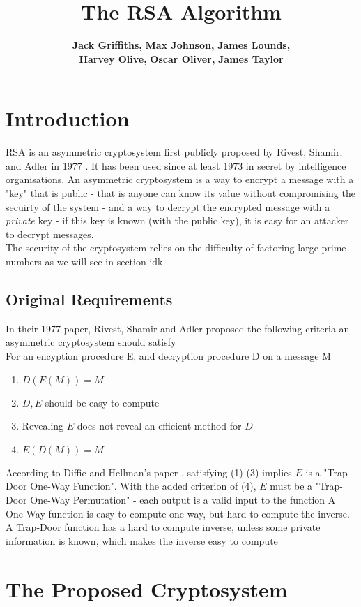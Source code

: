 \documentclass{article}
\author{
    {\bf Jack Griffiths,}
    {\bf Max Johnson,}
    {\bf James Lounds, } \\
    {\bf Harvey Olive, }
    {\bf Oscar Oliver, }
    {\bf James Taylor}
}
\title{The RSA Algorithm}
\begin{document}
\maketitle
\newpage

\section{Introduction}
RSA is an asymmetric cryptosystem first publicly proposed by Rivest, Shamir, and Adler in 1977 \cite{RSA}.
It has been used since at least 1973 in secret by intelligence organisations.
An asymmetric cryptosystem is a way to encrypt a message with a "key" that is public
- that is anyone can know its value without compromising the secuirty of the system -
and a way to decrypt the encrypted message with a \emph{private} key
- if this key is known (with the public key), it is easy for an attacker to decrypt messages.
\\
The security of the cryptosystem relies on the difficulty of factoring large prime numbers as we will see in section idk
\subsection{Original Requirements}
In their 1977 paper, Rivest, Shamir and Adler proposed the following criteria an asymmetric cryptosystem should satisfy
\\For an encyption procedure E, and decryption procedure D on a message M
\begin{enumerate}
    \item $D(E(M)) = M$
    \item $D, E$ should be easy to compute
    \item Revealing $E$ does not reveal an efficient method for $D$
    \item $E(D(M)) = M$
\end{enumerate}
According to Diffie and Hellman's paper \cite{Directions}, satisfying (1)-(3) implies $E$ is a "Trap-Door One-Way Function".
With the added criterion of (4), $E$ must be  a "Trap-Door One-Way Permutation" - each output is a valid input to the function
A One-Way function is easy to compute one way, but hard to compute the inverse.
A Trap-Door function has a hard to compute inverse, unless some private information is known, which makes the inverse easy to compute

\newpage
\section{The Proposed Cryptosystem}
\end{document}
